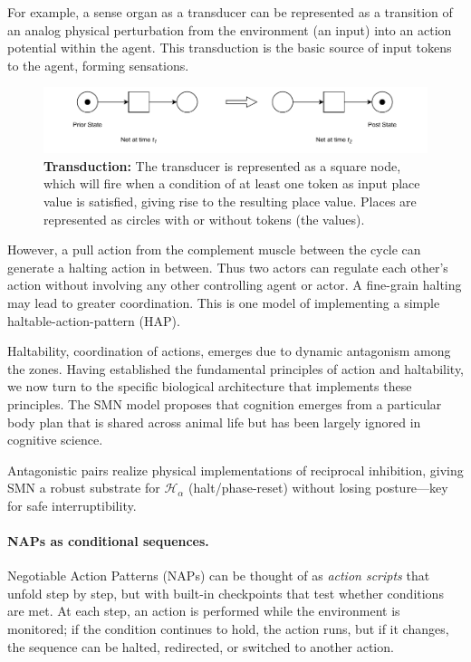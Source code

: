 For example, a sense organ as a transducer can be represented as a transition of an analog physical perturbation from the environment (an input) into an action potential within the agent. This transduction is the basic source of input tokens to the agent, forming sensations.
\begin{figure}[ht] 
\includegraphics[width=\textwidth]{graphics/PN_Transduction.pdf}
\caption{\textbf{Transduction:
}The transducer is represented as a square node, which will fire when a condition of at least one token as input place value is satisfied, giving rise to the resulting place value.
Places are represented as circles with or without tokens (the values).}
\label{transduction}
\end{figure}

However, a pull action from the complement muscle between the cycle can generate a halting action in between.  Thus two actors can regulate each other's action without involving any other controlling agent or actor. A fine-grain halting may lead to greater coordination.  This is one model of implementing a simple haltable-action-pattern (HAP). 

Haltability, coordination of actions, emerges due to dynamic antagonism among the zones. Having established the fundamental principles of action and haltability, we now turn to the specific biological architecture that implements these principles. The SMN model proposes that cognition emerges from a particular body plan that is shared across animal life but has been largely ignored in cognitive science.

Antagonistic pairs realize physical implementations of reciprocal inhibition, giving SMN a robust substrate for $\mathcal{H}_\alpha$ (halt/phase-reset) without losing posture—key for safe interruptibility.

\paragraph{NAPs as conditional sequences.}
Negotiable Action Patterns (NAPs) can be thought of as \emph{action scripts} that unfold step by step, 
but with built-in checkpoints that test whether conditions are met. 
At each step, an action is performed while the environment is monitored; 
if the condition continues to hold, the action runs, but if it changes, the sequence can be halted, redirected, or switched to another action. 

